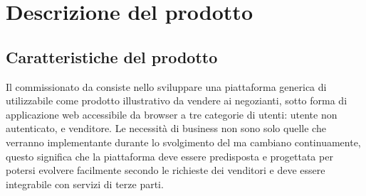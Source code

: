 \section{Descrizione del prodotto} \label{Desc}

\subsection{Caratteristiche del prodotto}
Il  \NomeProgetto{} commissionato da \Proponente{} consiste nello sviluppare una piattaforma generica di  utilizzabile come prodotto illustrativo da vendere ai negozianti, sotto forma di applicazione web accessibile da browser a tre categorie di utenti: utente non autenticato,  e venditore. Le necessità di business non sono solo quelle che verranno implementante durante lo svolgimento del  ma cambiano continuamente, questo significa che la piattaforma deve essere predisposta e progettata per potersi evolvere facilmente secondo le richieste dei venditori e deve essere integrabile con servizi di terze parti.

